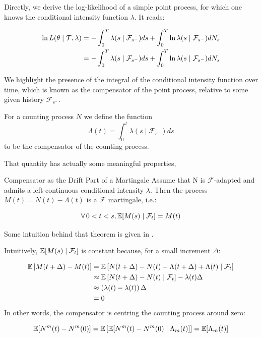 Directly, we derive the log-likelihood of a simple point process, for which one knows the conditional intensity function $\lambda$. It reads:

\begin{align}
\ln L( \theta \mid \mathcal{T}, \lambda ) &= - \int_0^T  \lambda(s \mid \mathcal F_{s^-}) ds + \int_0^T  \ln \lambda(s \mid \mathcal F_{s^-} )d N_s \notag \\
&=  - \int_0^T \lambda(s \mid \mathcal F_{s^-}) ds + \int_0^T  \ln \lambda(s \mid \mathcal F_{s^-} )d N_s 
\label{eq:intensity_lambda}
\end{align}

We highlight the presence of the integral of the conditional intensity function over time, which is known as the compensator of the point process, relative to some given history $\mathcal F_{s^-}$. 


\begin{definition}[Compensator]
\label{def:compensator}
For a counting process $N$ we define the function $$\Lambda(t) = \int_0^t \lambda (s \mid \mathcal F_{s^-} ) ds $$  to be the compensator of the counting process.
\end{definition}

That quantity has actually some meaningful properties,

\begin{theoreme}{Compensator as the Drift Part of a Martingale}
Assume that N is $\mathcal F$-adapted and admits a left-continuous conditional intensity $\lambda$. Then the process $M(t) = N(t) - \Lambda (t)$ is a $\mathcal F$ martingale, i.e.:

$$\forall 0 < t < s, \E [ M(s) \mid \mathcal F_t ] = M(t)$$
\end{theoreme}


\begin{demo}{}{}
Some intuition behind that theorem is given in \cite{daley}.

Intuitively, $\mathbb E[M(s) \mid \mathcal F_t]$ is constant because, for a small increment $\Delta$:

\begin{align*}
\mathbb E \left [ M( t + \Delta ) - M(t) \right ] &= \mathbb E \left[ N(t+ \Delta ) - N(t) - \Lambda( t + \Delta) + \Lambda(t) \mid \mathcal F_t \right ] \\
&\approx   \mathbb E \left[ N(t+ \Delta ) - N(t) \mid \mathcal F_t \right ] - \lambda(t) \Delta  \\
&\approx \left ( \lambda(t) - \lambda(t) \right  ) \Delta  \\
&= 0 
\end{align*}
In other words, the compensator is centring the counting process around zero: 

$$\mathbb E [ N^m (t) - N^m (0) ] = \mathbb E  \left  [ \mathbb E [ N^m (t) - N^m (0) \mid \Lambda_m(t) ]  \right ] = \mathbb E [ \Lambda_m (t) ] $$

\end{demo}


